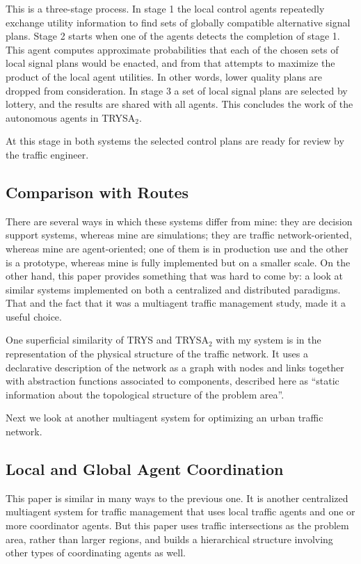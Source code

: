 \documentclass[11pt,letterpaper,onecolumn,twoside,openright,final]{report}
\begin{document}
This is a three-stage process.
In stage 1 the local control agents repeatedly exchange utility information to find sets of globally compatible alternative signal plans.
Stage 2 starts when one of the agents detects the completion of stage 1.
This agent computes approximate probabilities that each of the chosen sets of local signal plans would be enacted, and from that attempts to maximize the product of the local agent utilities.
In other words, lower quality plans are dropped from consideration.
In stage 3 a set of local signal plans are selected by lottery, and the results are shared with all agents.
This concludes the work of the autonomous agents in TRYSA$_{2}$.

At this stage in both systems the selected control plans are ready for review by the traffic engineer.

\subsection{Comparison with Routes}
There are several ways in which these systems differ from mine: they are decision support systems, whereas mine are simulations; they are traffic network-oriented, whereas mine are agent-oriented; one of them is in production use and the other is a prototype, whereas mine is fully implemented but on a smaller scale.
On the other hand, this paper provides something that was hard to come by: a look at similar systems implemented on both a centralized and distributed paradigms.
That and the fact that it was a multiagent traffic management study, made it a useful choice.

One superficial similarity of TRYS and TRYSA$_{2}$ with my system is in the representation of the physical structure of the traffic network.
It uses a declarative description of the network as a graph with nodes and links together with abstraction functions associated to components, described here as ``static information about the topological structure of the problem area''.

Next we look at another multiagent system for optimizing an urban traffic network.

\subsection{Local and Global Agent Coordination}
This paper\cite{france2003mso} is similar in many ways to the previous one.
It is another centralized multiagent system for traffic management that uses local traffic agents and one or more coordinator agents.
But this paper uses traffic intersections as the problem area, rather than larger regions, and builds a hierarchical structure involving other types of coordinating agents as well.
\end{document}
